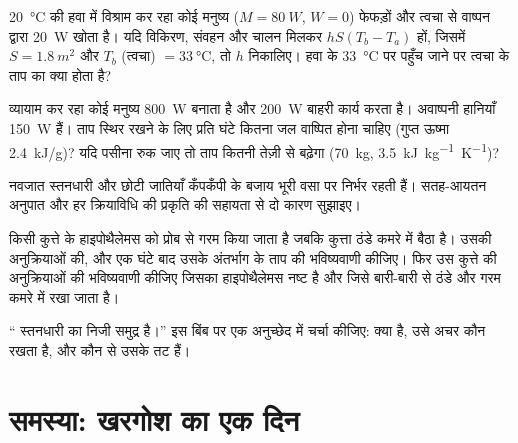 \begin{exercise}[$\star\star$]\label{exo:b1:mammal-organization:8}
\qty{20}{\celsius} की हवा में विश्राम कर रहा कोई मनुष्य
($M = \qty{80}{W}$, $W = 0$) फेफड़ों और त्वचा से वाष्पन द्वारा
\qty{20}{W} खोता है। यदि विकिरण, संवहन और चालन मिलकर
$hS(T_b - T_a)$ हों, जिसमें $S = \qty{1.8}{m^2}$ और $T_b$ (त्वचा) $=
\qty{33}{\celsius}$, तो $h$ निकालिए। हवा के \qty{33}{\celsius} पर पहुँच
जाने पर त्वचा के ताप का क्या होता है?
\end{exercise}

\begin{exercise}[$\star\star$]\label{exo:b1:mammal-organization:9}
व्यायाम कर रहा कोई मनुष्य \qty{800}{W} बनाता है और \qty{200}{W} बाहरी
कार्य करता है। अवाष्पनी हानियाँ \qty{150}{W} हैं। ताप स्थिर रखने के लिए
प्रति घंटे कितना जल वाष्पित होना चाहिए (गुप्त ऊष्मा
\qty{2.4}{kJ/g})? यदि पसीना रुक जाए तो ताप कितनी तेज़ी से बढ़ेगा
(\qty{70}{kg}, \qty{3.5}{kJ.kg^{-1}.K^{-1}})?
\end{exercise}

\begin{exercise}[$\star\star\star$]\label{exo:b1:mammal-organization:10}
नवजात स्तनधारी और छोटी जातियाँ कँपकँपी के बजाय भूरी वसा पर निर्भर रहती
हैं। सतह-आयतन अनुपात और हर क्रियाविधि की प्रकृति की सहायता से दो कारण
सुझाइए।
\end{exercise}

\begin{exercise}[$\star\star\star$]\label{exo:b1:mammal-organization:11}
किसी कुत्ते के हाइपोथैलेमस को प्रोब से गरम किया जाता है जबकि कुत्ता ठंडे
कमरे में बैठा है। उसकी अनुक्रियाओं की, और एक घंटे बाद उसके अंतर्भाग के
ताप की भविष्यवाणी कीजिए। फिर उस कुत्ते की अनुक्रियाओं की भविष्यवाणी
कीजिए जिसका हाइपोथैलेमस नष्ट है और जिसे बारी-बारी से ठंडे और गरम कमरे
में रखा जाता है।
\end{exercise}

\begin{exercise}[$\star\star\star$]\label{exo:b1:mammal-organization:12}
`` स्तनधारी का निजी समुद्र है।'' इस बिंब पर एक अनुच्छेद
में चर्चा कीजिए:  क्या है, उसे अचर कौन रखता है, और कौन
से  उसके तट हैं।
\end{exercise}

\section{समस्या: खरगोश का एक दिन}


